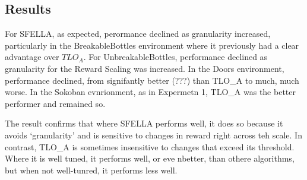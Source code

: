 \subsection{Results}

For SFELLA, as expected, perormance declined as granularity increased, particularly in the BreakableBottles environment where it previously had a clear advantage over $TLO_A$. For UnbreakableBottles, performance declined as granularity for the Reward Scaling was increased. In the Doors environment, performance declined, from signifantly better (???) than TLO_A to much, much worse. In the Sokoban evnrionment, as in Expermetn 1, TLO_A was the better performer and remained so.

The result confirms that where SFELLA performs well, it does so because it avoids `granularity' and is sensitive to changes in reward right across teh scale. In contrast, TLO_A is sometimes insensitive to changes that exceed its threshold. Where it is well tuned, it performs well, or eve nbetter, than othere algorithms, but when not well-tunred, it performs less well.

